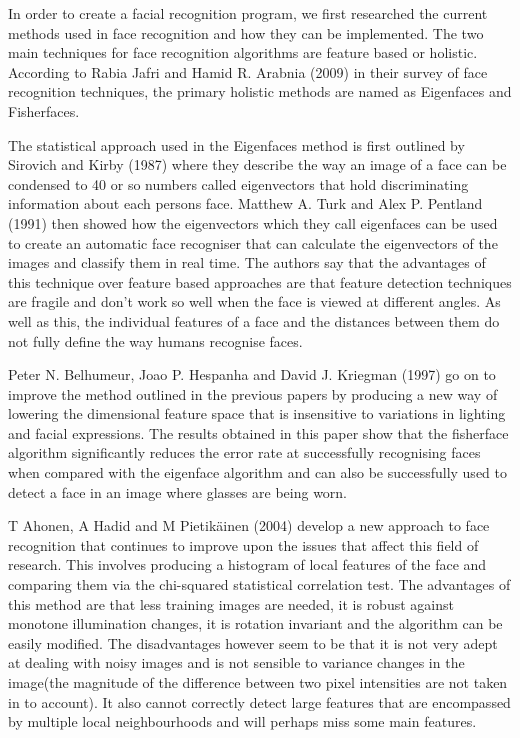 In order to create a facial recognition program, we first researched the current methods used in face recognition and how they can be implemented. The two main techniques for face recognition algorithms are feature based or holistic. According to Rabia Jafri and Hamid R. Arabnia (2009)\cite{FR_survey} in their survey of face recognition techniques, the primary holistic methods are named as Eigenfaces and Fisherfaces.

The statistical approach used in the Eigenfaces method is first outlined by Sirovich and Kirby (1987)\cite{sirovich1987low} where they describe the way an image of a face can be condensed to 40 or so numbers called eigenvectors that hold discriminating information about each persons face.
Matthew A. Turk and Alex P. Pentland (1991)\cite{turk1991face} then showed how the eigenvectors which they call eigenfaces can be used to create an automatic face recogniser that can calculate the eigenvectors of the images and classify them in real time. The authors say that the advantages of this technique over feature based approaches are that feature detection techniques are fragile and don't work so well when the face is viewed at different angles. As well as this, the individual features of a face and the distances between them do not fully define the way humans recognise faces.

Peter N. Belhumeur, Joao P. Hespanha and David J. Kriegman (1997)\cite{Eigenfaces_vs_Fisherfaces} go on to improve the method outlined in the previous papers by producing a new way of lowering the dimensional feature space that is insensitive to variations in lighting and facial expressions. The results obtained in this paper show that the fisherface algorithm significantly reduces the error rate at successfully recognising faces when compared with the eigenface algorithm and can also be successfully used to detect a face in an image where glasses are being worn.


T Ahonen, A Hadid and M Pietik\"{a}inen (2004)\cite{ahonen2004face} develop a new approach to face recognition that continues to improve upon the issues that affect this field of research. This involves producing a histogram of local features of the face and comparing them via the chi-squared statistical correlation test. The advantages of this method are that less training images are needed, it is robust against monotone illumination changes, it is rotation invariant and the algorithm can be easily modified. The disadvantages however seem to be that it is not very adept at dealing with noisy images and is not sensible to variance changes in the image(the magnitude of the difference between two pixel intensities are not taken in to account). It also cannot correctly detect large features that are encompassed by multiple local neighbourhoods and will perhaps miss some main features.





	


